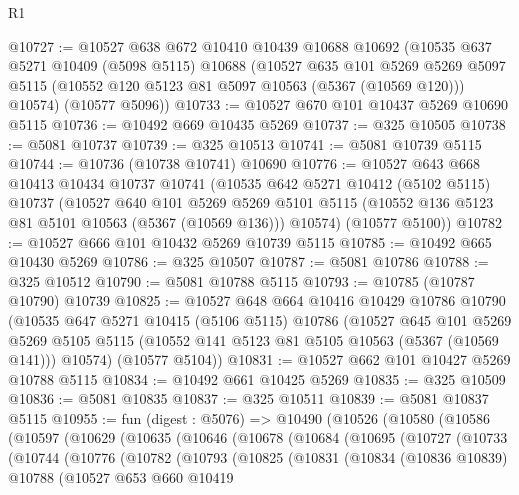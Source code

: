 \begin{lexlean}{R1}
\begin{coremodule}
@10727 := @10527
    @638
    @672
    @10410
    @10439
    @10688
    @10692
    (@10535
      @637
      @5271
      @10409
      (@5098 @5115)
      @10688
      (@10527
        @635
        @101
        @5269
        @5269
        @5097
        @5115
        (@10552 @120 @5123 @81 @5097 @10563 (@5367 (@10569 @120)))
        @10574)
      (@10577 @5096))
@10733 := @10527 @670 @101 @10437 @5269 @10690 @5115
@10736 := @10492 @669 @10435 @5269
@10737 := @325 @10505
@10738 := @5081 @10737
@10739 := @325 @10513
@10741 := @5081 @10739 @5115
@10744 := @10736 (@10738 @10741) @10690
@10776 := @10527
    @643
    @668
    @10413
    @10434
    @10737
    @10741
    (@10535
      @642
      @5271
      @10412
      (@5102 @5115)
      @10737
      (@10527
        @640
        @101
        @5269
        @5269
        @5101
        @5115
        (@10552 @136 @5123 @81 @5101 @10563 (@5367 (@10569 @136)))
        @10574)
      (@10577 @5100))
@10782 := @10527 @666 @101 @10432 @5269 @10739 @5115
@10785 := @10492 @665 @10430 @5269
@10786 := @325 @10507
@10787 := @5081 @10786
@10788 := @325 @10512
@10790 := @5081 @10788 @5115
@10793 := @10785 (@10787 @10790) @10739
@10825 := @10527
    @648
    @664
    @10416
    @10429
    @10786
    @10790
    (@10535
      @647
      @5271
      @10415
      (@5106 @5115)
      @10786
      (@10527
        @645
        @101
        @5269
        @5269
        @5105
        @5115
        (@10552 @141 @5123 @81 @5105 @10563 (@5367 (@10569 @141)))
        @10574)
      (@10577 @5104))
@10831 := @10527 @662 @101 @10427 @5269 @10788 @5115
@10834 := @10492 @661 @10425 @5269
@10835 := @325 @10509
@10836 := @5081 @10835
@10837 := @325 @10511
@10839 := @5081 @10837 @5115
@10955 := fun (digest : @5076) =>
  @10490
    (@10526
      (@10580
        (@10586
          (@10597
            (@10629
              (@10635
                (@10646
                  (@10678
                    (@10684
                      (@10695
                        (@10727
                          (@10733
                            (@10744
                              (@10776
                                (@10782
                                  (@10793
                                    (@10825
                                      (@10831
                                        (@10834
                                          (@10836 @10839)
                                          @10788
                                          (@10527
                                            @653
                                            @660
                                            @10419

\end{coremodule}
\end{lexlean}
